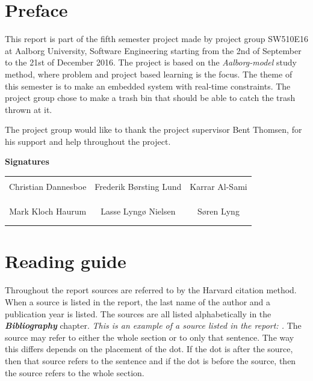 \chapter*{Preface}
This report is part of the fifth semester project made by project group SW510E16 at Aalborg University, Software Engineering starting from the 2nd of September to the 21st of December 2016. \newline
The project is based on the \textit{Aalborg-model} study method, where problem and project based learning is the focus. The theme of this semester is to make an embedded system with real-time constraints. The project group chose to make a trash bin that should be able to catch the trash thrown at it. \newline

The project group would like to thank the project supervisor Bent Thomsen, for his  support and help throughout the project. 
\newline
\newline
\newline
\newline


{\Huge\textbf{Signatures}}
\newline
\newline


\begin{table}[H]
	\centering
	\begin{tabular}{c c c}
		\underline{\phantom{mmmmmmmmmmmmmm}} & \underline{\phantom{mmmmmmmmmmmmmm}} & \underline{\phantom{mmmmmmmmmmmmmm}} \\
		Christian Dannesboe			& Frederik Børsting Lund 		& Karrar Al-Sami 			\\
		&&\\
		&&\\
		\underline{\phantom{mmmmmmmmmmmmmm}} & \underline{\phantom{mmmmmmmmmmmmmm}} & \underline{\phantom{mmmmmmmmmmmmmm}} \\
		Mark Kloch Haurum			& Lasse Lyngø Nielsen 		& Søren Lyng 				\\
		&&\\
		&&\\
		
	\end{tabular}
\end{table}


\chapter*{Reading guide}
Throughout the report sources are referred to by the Harvard citation method. When a source is listed in the report, the last name of the author and a publication year is listed. The sources are all listed alphabetically in the \textit{\textbf{Bibliography}} chapter. \newline
\textit{This is an example of a source listed in the report: \textbf{\citep{safe}}.} \newline
The source may refer to either the whole section or to only that sentence. The way this differs depends on the placement of the dot. If the dot is after the source, then that source refers to the sentence and if the dot is before the source, then the source refers to the whole section. 


